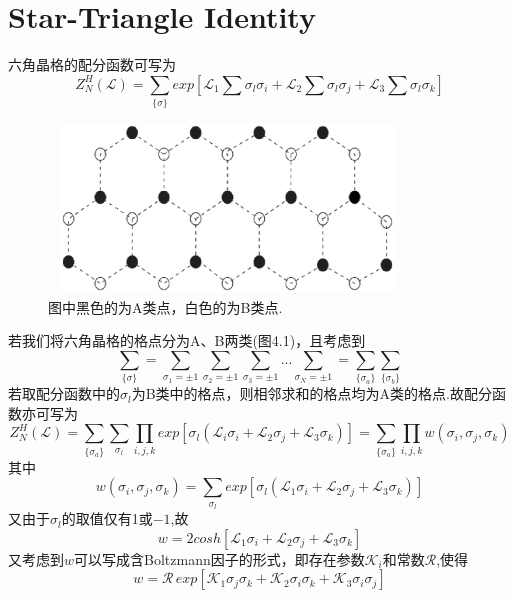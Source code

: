 \documentclass[a4paper]{book}
\begin{document}
\chapter{Star-Triangle Identity}
六角晶格的配分函数可写为
	\begin{equation}
		Z_N^H(\mathcal{L})=\sum_{\{\sigma\}}exp[\mathcal{L}_1\sum \sigma_l\sigma_i+\mathcal{L}_2\sum \sigma_l\sigma_j+\mathcal{L}_3\sum \sigma_l\sigma_k]
	\end{equation}
	 \begin{figure}[!h]
		\centering
		\includegraphics[width=9.5cm,height=4.5cm]{figures/6.eps}
		\caption{图中黑色的为A类点，白色的为B类点.}
	\end{figure}
若我们将六角晶格的格点分为A、B两类(图4.1)，且考虑到
\begin{equation}
	\sum_{\{\sigma\}}=\sum_{\sigma_1=\pm1}\sum_{\sigma_2=\pm1}\sum_{\sigma_3=\pm1}...\sum_{\sigma_N=\pm1}=\sum_{\{\sigma_a\}}\sum_{\{\sigma_b\}}
\end{equation}
若取配分函数中的$\sigma_l$为B类中的格点，则相邻求和的格点均为A类的格点.故配分函数亦可写为
\begin{equation}\label{4.3}
		Z_N^H(\mathcal{L})=\sum_{\{\sigma_a\}}\sum_{\sigma_l}\prod_{i,j,k}exp[\sigma_l(\mathcal{L}_i\sigma_i+\mathcal{L}_2\sigma_j+\mathcal{L}_3\sigma_k)]=\sum_{\{\sigma_a\}}\prod_{i,j,k}w(\sigma_i,\sigma_j,\sigma_k)
\end{equation}
其中
\begin{equation}
	w(\sigma_i,\sigma_j,\sigma_k)=\sum_{\sigma_l}exp[\sigma_l(\mathcal{L}_1\sigma_i+\mathcal{L}_2\sigma_j+\mathcal{L}_3\sigma_k)]
\end{equation}
又由于$\sigma_l$的取值仅有1或$-1$,故
\begin{equation}
	w=2cosh[\mathcal{L}_1\sigma_i+\mathcal{L}_2\sigma_j+\mathcal{L}_3\sigma_k]
\end{equation}
又考虑到$w$可以写成含Boltzmann因子的形式，即存在参数$\mathcal{K}_i$和常数$\mathcal{R}$,使得
\begin{equation}\label{4.6}
	w=\mathcal{R}\,exp[\mathcal{K}_1\sigma_j\sigma_k+\mathcal{K}_2\sigma_i\sigma_k+\mathcal{K}_3\sigma_i\sigma_j]
\end{equation}
\end{document}
